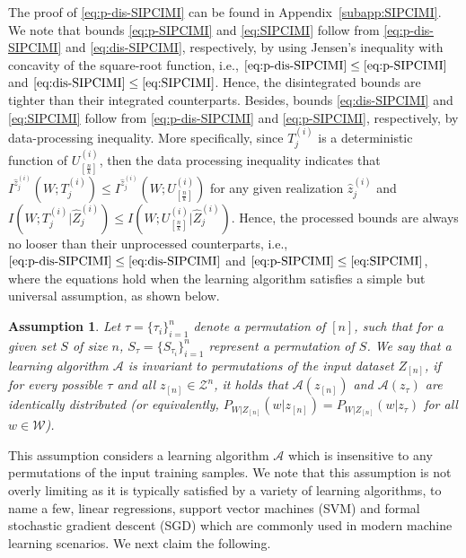 \documentclass[onecolumn,romanappendices,10pt]{IEEEtran}
\newtheorem{assumption}{Assumption}
\newcommand{\Acal}{{\mathcal A}}
\newcommand{\Wcal}{{\mathcal W}}
\newcommand{\Zcal}{{\mathcal Z}}
\begin{document}
	The proof of \eqref{eq:p-dis-SIPCIMI} can be found in Appendix~\ref{subapp:SIPCIMI}. We note that bounds \eqref{eq:p-SIPCIMI} and \eqref{eq:SIPCIMI} follow from \eqref{eq:p-dis-SIPCIMI} and \eqref{eq:dis-SIPCIMI}, respectively, by using Jensen's inequality with concavity of the square-root function, i.e., $\eqref{eq:p-dis-SIPCIMI} \leq \eqref{eq:p-SIPCIMI}$ and $\eqref{eq:dis-SIPCIMI} \leq \eqref{eq:SIPCIMI}$. Hence, the disintegrated bounds are tighter than their integrated counterparts. Besides, bounds \eqref{eq:dis-SIPCIMI} and \eqref{eq:SIPCIMI} follow from \eqref{eq:p-dis-SIPCIMI} and \eqref{eq:p-SIPCIMI}, respectively, by data-processing inequality. More specifically, since $T^{(i)}_j$ is a deterministic function of $U^{(i)}_{[\frac{n}{k}]}$, then the data processing inequality indicates that $I^{\hat{z}^{(i)}_j}( W; T^{(i)}_j ) \leq I^{\hat{z}^{(i)}_j}( W; U^{(i)}_{[\frac{n}{k}]} )$ for any given realization $\hat{z}^{(i)}_j$ and $I( W; T^{(i)}_j | \hat{Z}^{(i)}_j ) \leq I( W; U^{(i)}_{[\frac{n}{k}]} | \hat{Z}^{(i)}_j )$. Hence, the processed bounds are always no looser than their unprocessed counterparts, i.e., $\eqref{eq:p-dis-SIPCIMI} \leq \eqref{eq:dis-SIPCIMI}$ and $\eqref{eq:p-SIPCIMI} \leq \eqref{eq:SIPCIMI}$, where the equations hold when the learning algorithm satisfies a simple but universal assumption, as shown below.
	
	\begin{assumption} \label{ass:invariant-alg}
		Let $\tau = \{\tau_i\}_{i=1}^n$ denote a permutation of $[n]$, such that for a given set $S$ of size $n$, $S_{\tau} = \{S_{\tau_i}\}_{i=1}^n$ represent a permutation of $S$. We say that a learning algorithm $\Acal$ is invariant to permutations of the input dataset $Z_{[n]}$, if for every possible $\tau$ and all $z_{[n]} \in \Zcal^n$, it holds that $\Acal(z_{[n]})$ and $\Acal(z_{\tau})$ are identically distributed (or equivalently, $P_{W| Z_{[n]}} (w | z_{[n]}) = P_{W| Z_{[n]}} (w | z_{\tau})$ for all $w \in \Wcal$).
	\end{assumption}
	
	This assumption considers a learning algorithm $\Acal$ which is insensitive to any permutations of the input training samples. We note that this assumption is not overly limiting as it is typically satisfied by a variety of learning algorithms, to name a few, linear regressions, support vector machines (SVM) and formal stochastic gradient descent (SGD) which are commonly used in modern machine learning scenarios. We next claim the following.
	
\end{document}
